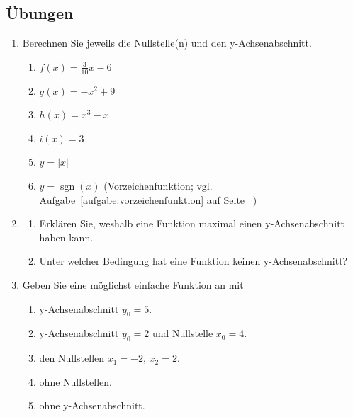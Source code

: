 \subsection{Übungen}
\begin{enumerate}
    \item Berechnen Sie jeweils die Nullstelle(n) und den y-Achsenabschnitt.
          \begin{enumerate}
              \item \( f(x) = \tfrac{3}{10}x - 6 \)
              \item \( g(x) = -x^2 + 9 \)
              \item \( h(x) = x^3 - x \)
              \item \(i(x)=3\)
              \item \(y=|x|\)
              \item \( y = \operatorname{sgn}(x) \) (Vorzeichenfunktion; vgl. Aufgabe~\ref{aufgabe:vorzeichenfunktion} auf Seite ~\pageref{aufgabe:vorzeichenfunktion})
          \end{enumerate}
    \item \begin{enumerate}
              \item Erklären Sie, weshalb eine Funktion maximal einen y-Achsenabschnitt haben kann.
              \item Unter welcher Bedingung hat eine Funktion keinen y-Achsenabschnitt?
          \end{enumerate}
    \item Geben Sie eine möglichst einfache Funktion an mit
          \begin{enumerate}
              \item y-Achsenabschnitt \( y_0 = 5 \).
              \item y-Achsenabschnitt \( y_0 = 2 \) und Nullstelle \( x_0 = 4 \).
              \item den Nullstellen \( x_1 = -2,\, x_2 = 2 \).
              \item ohne Nullstellen.
              \item ohne y-Achsenabschnitt.
          \end{enumerate}
\end{enumerate}
\newpage
